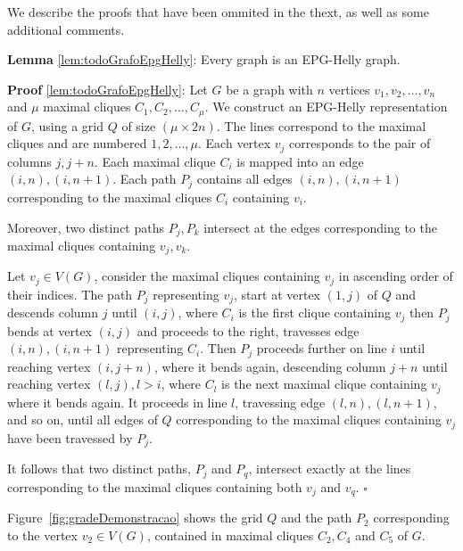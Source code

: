 \documentclass[9pt]{entcs}
\begin{document}
We describe the proofs that have been ommited in the thext, as well as some additional comments.


\begin{lema*} \textbf{Lemma} \ref{lem:todoGrafoEpgHelly}:
 Every graph is an EPG-Helly graph.
 \end{lema*}
 
  \begin{prove*}  \textbf{Proof} \ref{lem:todoGrafoEpgHelly}:
  Let $G$ be a graph with $n$ vertices $v_1, v_2, \dots, v_n$ and $\mu$ maximal cliques $C_1, C_2, \dots , C_{\mu }$. We construct an EPG-Helly representation of $G$, using a grid $Q$ of size $(\mu \times 2n)$. The lines correspond to the maximal cliques and are numbered $1, 2, \dots , \mu$. Each vertex $v_j$ corresponds to the pair of columns $j, j+n$. Each maximal clique $C_i$ is mapped into an edge $(i,n), (i,n+1)$. Each path $P_j$ contains all edges $(i,n), (i,n+1)$ corresponding to the maximal cliques $C_i$ containing $v_i$.
  
  Moreover, two distinct paths $P_j,P_k$ intersect at the edges corresponding to the maximal cliques containing $v_j,v_k$.
  
  Let $v_j \in V(G)$, consider the maximal cliques containing $v_j$ in ascending order of their indices. The path $P_j$ representing $v_j$, start at vertex $(1,j)$ of $Q$ and descends column $j$ until $(i,j)$, where $C_i$ is the first clique containing $v_j$ then $P_j$ bends at vertex $(i,j)$ and proceeds to the right, travesses edge $(i,n), (i,n+1)$ representing $C_i$. Then $P_j$ proceeds further on line $i$ until reaching vertex $(i, j+n)$, where it bends again, descending column $j+n$ until reaching vertex $(l,j), l>i$, where $C_l$ is the next maximal clique containing $v_j$ where it bends again. It proceeds in line $l$, travessing edge $(l,n),(l,n+1)$, and so on, until all edges of $Q$ corresponding to the maximal cliques containing $v_j$ have been travessed by $P_j$.   
  
It follows that two distinct paths, $P_j$ and $P_q$, intersect exactly at the lines corresponding to the maximal cliques containing both $v_j$ and $v_q$.  
  $\square$ \end{prove*}
 
 Figure~\ref{fig:gradeDemonstracao} shows the grid $Q$ and the path $P_2$ corresponding to the vertex $v_2 \in V(G)$, contained in maximal cliques $C_2, C_4$ and $C_5$ of $G$.
 
\end{document}

